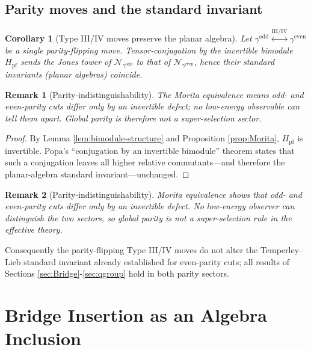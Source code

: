 \documentclass[11pt]{article}
\newtheorem{remark}{Remark}[section]
\newtheorem{corollary}{Corollary}
\begin{document}
\subsection*{Parity moves and the standard invariant}

\begin{corollary}[Type III/IV moves preserve the planar algebra]
\label{cor:parity-standard-invariant}
Let
$\gamma^{\mathrm{odd}}\!\overset{\mathrm{III/IV}}{\leftrightarrow}
 \gamma^{\mathrm{even}}$ be a single parity-flipping move.
Tensor-conjugation by the invertible bimodule
$H_{\mathrm{pf}}$ sends the Jones tower of
$\mathcal N_{\gamma^{\mathrm{odd}}}$ to that of
$\mathcal N_{\gamma^{\mathrm{even}}}$,
hence their standard invariants (planar algebras) coincide.
\end{corollary}

\begin{remark}[Parity‐indistinguishability]
The Morita equivalence means odd- and even-parity cuts differ only by an
invertible defect; no low-energy observable can tell them apart.
Global parity is therefore \emph{not} a super-selection sector.
\end{remark}

\begin{proof}
By Lemma \ref{lem:bimodule-structure} and
Proposition \ref{prop:Morita},
$H_{\mathrm{pf}}$ is invertible.
Popa’s “conjugation by an invertible bimodule” theorem
\cite[Prop.\,2.3]{PopaMorita} states that such a conjugation
leaves all higher relative commutants—and therefore
the planar-algebra standard invariant—unchanged.
\end{proof}

\begin{remark}[Parity‐indistinguishability]
Morita equivalence shows that odd- and even-parity cuts differ only by an
invertible defect.  No low-energy observer can distinguish the two
sectors, so global parity is not a super-selection rule in the effective
theory.
\end{remark}

\noindent
Consequently the parity-flipping Type III/IV moves do not alter the
Temperley–Lieb standard invariant already established for even-parity
cuts; all results of Sections \ref{sec:Bridge}-\ref{sec:qgroup} hold in
both parity sectors.


\section{Bridge Insertion as an Algebra Inclusion}
\end{document}
